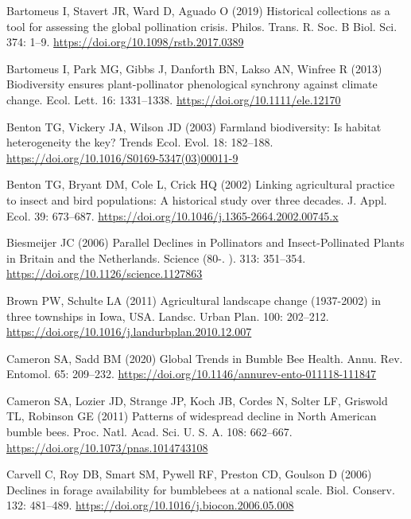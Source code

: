 \documentclass[11pt,]{article}
\begin{document}
\hypertarget{refs}{}
\leavevmode\hypertarget{ref-Bartomeus2019}{}%
Bartomeus I, Stavert JR, Ward D, Aguado O (2019) Historical collections
as a tool for assessing the global pollination crisis. Philos. Trans. R.
Soc. B Biol. Sci. 374: 1--9.
\url{https://doi.org/10.1098/rstb.2017.0389}

\leavevmode\hypertarget{ref-Bartomeus2013}{}%
Bartomeus I, Park MG, Gibbs J, Danforth BN, Lakso AN, Winfree R (2013)
Biodiversity ensures plant-pollinator phenological synchrony against
climate change. Ecol. Lett. 16: 1331--1338.
\url{https://doi.org/10.1111/ele.12170}

\leavevmode\hypertarget{ref-Benton2003}{}%
Benton TG, Vickery JA, Wilson JD (2003) Farmland biodiversity: Is
habitat heterogeneity the key? Trends Ecol. Evol. 18: 182--188.
\url{https://doi.org/10.1016/S0169-5347(03)00011-9}

\leavevmode\hypertarget{ref-Benton2002}{}%
Benton TG, Bryant DM, Cole L, Crick HQ (2002) Linking agricultural
practice to insect and bird populations: A historical study over three
decades. J. Appl. Ecol. 39: 673--687.
\url{https://doi.org/10.1046/j.1365-2664.2002.00745.x}

\leavevmode\hypertarget{ref-Biesmeijer2006}{}%
Biesmeijer JC (2006) Parallel Declines in Pollinators and
Insect-Pollinated Plants in Britain and the Netherlands. Science (80-.
). 313: 351--354. \url{https://doi.org/10.1126/science.1127863}

\leavevmode\hypertarget{ref-Brown2011}{}%
Brown PW, Schulte LA (2011) Agricultural landscape change (1937-2002) in
three townships in Iowa, USA. Landsc. Urban Plan. 100: 202--212.
\url{https://doi.org/10.1016/j.landurbplan.2010.12.007}

\leavevmode\hypertarget{ref-Cameron2020}{}%
Cameron SA, Sadd BM (2020) Global Trends in Bumble Bee Health. Annu.
Rev. Entomol. 65: 209--232.
\url{https://doi.org/10.1146/annurev-ento-011118-111847}

\leavevmode\hypertarget{ref-Cameron2011}{}%
Cameron SA, Lozier JD, Strange JP, Koch JB, Cordes N, Solter LF,
Griswold TL, Robinson GE (2011) Patterns of widespread decline in North
American bumble bees. Proc. Natl. Acad. Sci. U. S. A. 108: 662--667.
\url{https://doi.org/10.1073/pnas.1014743108}

\leavevmode\hypertarget{ref-Carvell2006b}{}%
Carvell C, Roy DB, Smart SM, Pywell RF, Preston CD, Goulson D (2006)
Declines in forage availability for bumblebees at a national scale.
Biol. Conserv. 132: 481--489.
\url{https://doi.org/10.1016/j.biocon.2006.05.008}
\end{document}
